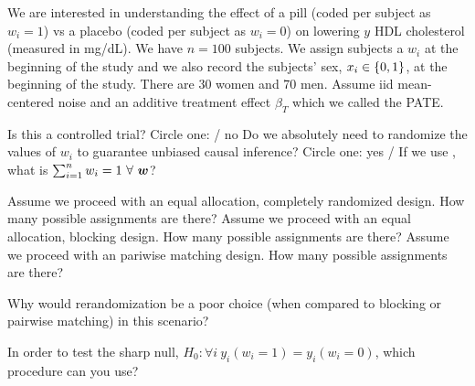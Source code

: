 \documentclass[12pt]{article}
\begin{document}
\problem We are interested in understanding the effect of a pill (coded per subject as $w_i=1$) vs a placebo (coded per subject as $w_i=0$) on lowering $y$ HDL cholesterol (measured in mg/dL). We have $n=100$ subjects. We assign subjects a $w_i$ at the beginning of the study and we also record the subjects' sex, $x_i \in \left\{0,1\right\}$, at the beginning of the study. There are 30 women and 70 men. Assume iid mean-centered noise and an additive treatment effect $\beta_T$ which we called the PATE.

\begin{enumerate}

 Is this a controlled trial? Circle one:  / no  
 Do we absolutely need to randomize the values of $w_i$ to guarantee unbiased causal inference? Circle one: yes /   
 If we use , what is $\sum_{i=1}^n w_i=1~\forall~\boldsymbol{w}$? 

 Assume we proceed with an equal allocation, completely randomized design. How many possible assignments are there? 
 Assume we proceed with an equal allocation, blocking design. How many possible assignments are there? 
 Assume we proceed with an pariwise matching design. How many possible assignments are there? 


 Why would rerandomization be a poor choice (when compared to blocking or pairwise matching) in this scenario?\\


 In order to test the sharp null, $H_0: \forall i ~y_i(w_i=1) = y_i(w_i=0)$, which procedure can you use?\\

\end{enumerate}
\end{document}
